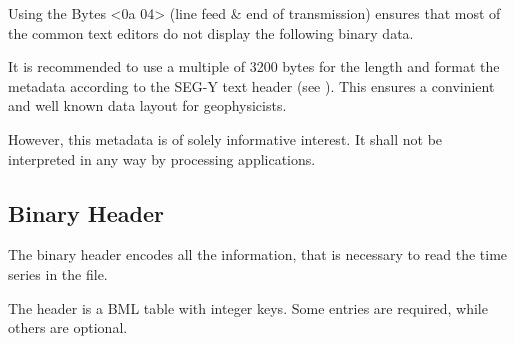 \documentclass[DIV=10]{scrartcl}
\newcommand\litref[1]{\textref{[#1]}}
\begin{document}
Using the Bytes <0a 04> (line feed \& end of transmission) ensures that most of the common text editors do not display the following binary data.

It is recommended to use a multiple of 3200 bytes for the length and format the metadata according to the SEG-Y text header (see \litref{Segy02}).
This ensures a convinient and well known data layout for geophysicists.

However, this metadata is of solely informative interest.
It shall not be interpreted in any way by processing applications.

\clearpage

\subsection{Binary Header}

The binary header encodes all the information, that is necessary to read the time series in the file.

The header is a BML table with integer keys.
Some entries are required, while others are optional.
\end{document}
